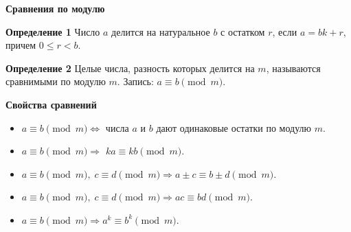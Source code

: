 \documentclass{article}
\begin{document}
    \large

    \begin{center}
        \textbf{Сравнения по модулю}
    \end{center}


    \textbf{Определение 1}
    Число $a$ делится на натуральное $b$ с остатком $r$, если $a = bk + r$, причем $0 \le r < b$.

    \textbf{Определение 2}
    Целые числа, разность которых делится на $m$, называются сравнимыми по модулю $m$.
    Запись: $a \equiv b \pmod{m}$.

    \textbf{Свойства сравнений}

    \begin{itemize}
        \item $a \equiv b \pmod{m} \Leftrightarrow$ числа $a$ и $b$ дают одинаковые остатки по модулю $m$.

        \item $a \equiv b \pmod{m} \Rightarrow$ $ka \equiv kb \pmod{m}$.

        \item $a \equiv b \pmod{m},\; c \equiv d \pmod{m} \Rightarrow a\pm c \equiv b\pm d \pmod{m}$.

        \item $a \equiv b \pmod{m},\; c \equiv d \pmod{m} \Rightarrow ac \equiv bd \pmod{m}$.

        \item $a \equiv b \pmod{m} \Rightarrow a^k \equiv b^k \pmod{m}$.
    \end{itemize}
\end{document}
